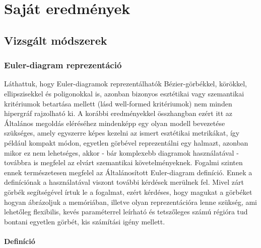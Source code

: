 

\cleardoublepage
\chapter{Saját eredmények}
\section{Vizsgált módszerek}

\subsection{Euler-diagram reprezentáció}

Láthattuk, hogy Euler-diagramok reprezentálhatók Bézier-görbékkel, körökkel, ellipszisekkel és poligonokkal is, azonban bizonyos esztétikai vagy szemantikai kritériumok betartása mellett (lásd well-formed kritériumok) nem minden hipergráf rajzolható ki. A korábbi eredményekkel összhangban ezért itt az 
Általános megoldás eléréséhez mindenképp egy olyan modell bevezetése szükséges, amely egyszerre képes kezelni az ismert esztétikai metrikákat, így például kompakt módon, egyetlen görbével reprezentálni egy halmazt, azonban mikor ez nem lehetséges, akkor - bár komplexebb diagramok használatával - továbbra is megfelel az elvárt szemantikai követelményeknek. Fogalmi szinten ennek természetesen megfelel az Általánosított Euler-diagram definíció. Ennek a definíciónak a használatával viszont további kérdések merülnek fel. Mivel zárt görbék segítségével írtuk le a fogalmat, ezért kérdéses, hogy magukat a görbéket hogyan ábrázoljuk a memóriában, illetve olyan reprezentációra lenne szükség, ami lehetőleg flexibilis, kevés paraméterrel leírható és tetszőleges számú régióra tud bontani egyetlen görbét, kis számítási igény mellett.

\subsubsection{Definíció} \label{eulerSolution}

